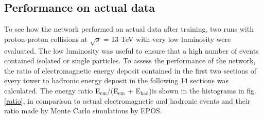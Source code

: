 \subsection{Performance on actual data}
To see how the network performed on actual data after training, two runs with proton-proton collisions at $\sqrt{s}$ = 13 TeV with very low luminosity were evaluated. The low luminosity was useful to ensure that a high number of events contained isolated or single particles. To assess the performance of the network, the ratio of electromagnetic energy deposit contained in the first two sections of every tower to hadronic energy deposit in the following 14 sections was calculated. The energy ratio E$_{\mathrm{em}}$/(E$_{\mathrm{em}}$ + E$_{\mathrm{had}}$)is shown in the histograms in fig. \ref{ratio}, in comparison to actual electromagnetic and hadronic events and their ratio made by Monte Carlo simulations by EPOS. 
